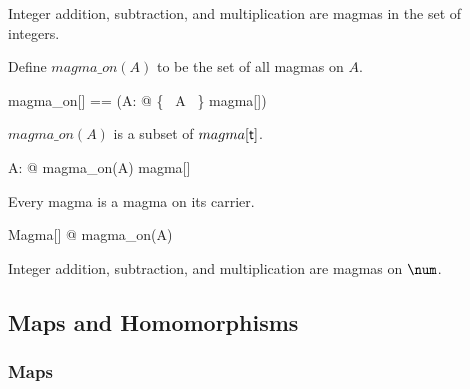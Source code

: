 \documentclass{amsart}
\begin{document}
\begin{example}
Integer addition, subtraction, and multiplication are magmas in the set of integers.


\end{example}

Define $magma\_on(A)$ to be the set of all magmas on $A$.

\begin{zed}
	magma\_on[\genT] == (\lambda A: \power \genT @ \{~ A ~\} \dres magma[\genT])
\end{zed}

\begin{remark}
$magma\_on(A)$ is a subset of $magma[\mathsf{t}]$.

\begin{zed}
	\forall A:  \power \setT @ magma\_on(A) \subseteq magma[\setT]
\end{zed}
\end{remark}

\begin{remark}
Every magma is a magma on its carrier.

\begin{zed}
	\forall Magma[\setT] @ \strucA \in magma\_on(A)
\end{zed}

\end{remark}

\begin{example}

Integer addition, subtraction, and multiplication are magmas on $\num$.


\end{example}

\subsection{Maps and Homomorphisms}

\subsubsection{Maps}
\end{document}
